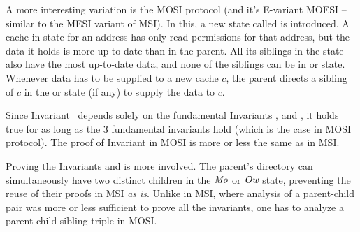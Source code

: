 A more interesting variation is the MOSI protocol (and it's E-variant MOESI --
similar to the MESI variant of MSI). In this, a new state called \Ow{} is
introduced. A cache in \Ow{} state for an address has only read permissions for
that address, but the data it holds is more up-to-date than in the parent.  All
its siblings in the \Sh{} state also have the most up-to-date data, and none of
the siblings can be in \Mo{} or \Ow{} state.  Whenever data has to be supplied
to a new cache $c$, the parent directs a sibling of $c$ in the \Ow{} or \Mo{}
state (if any) to supply the data to $c$.

Since Invariant~ depends solely on the fundamental Invariants
,  and , it holds true
for as long as the 3 fundamental invariants hold (which is the case in MOSI
protocol). The proof of Invariant  in MOSI is more
or less the same as in MSI.

Proving the Invariants  and
 is more involved. The parent's directory can
simultaneously have two distinct children in the $\textit{Mo}$ or $\textit{Ow}$ state,
preventing the reuse of their proofs in MSI \emph{as is}. Unlike in MSI, where
analysis of a parent-child pair was more or less sufficient to prove all the
invariants, one has to analyze a parent-child-sibling triple in MOSI.


